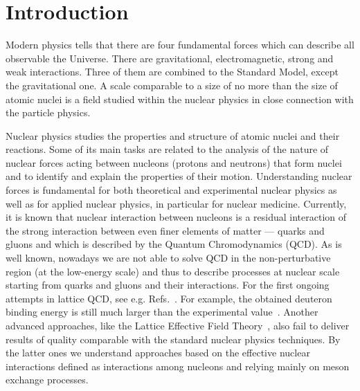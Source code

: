 \chapter{Introduction}
\label{introduction}
Modern physics tells that there are four fundamental forces which can describe all observable the Universe. There are gravitational, electromagnetic, strong and weak interactions. Three of them are combined to the Standard Model, except the gravitational one. A scale comparable to a size of no more than the size of atomic nuclei is a field studied within the nuclear physics in close connection with the particle physics.

Nuclear physics studies the properties and structure of atomic nuclei and their reactions. Some of its main tasks are related to the analysis of the nature of nuclear forces acting between nucleons (protons and neutrons) that form nuclei and to identify and explain the properties of their motion. Understanding nuclear forces is fundamental for both theoretical and experimental nuclear physics as well as for applied nuclear physics, in particular for nuclear medicine. Currently, it is known that nuclear interaction between nucleons is a residual interaction of the strong interaction between even finer elements of matter --- quarks and gluons and which is described by the Quantum Chromodynamics (QCD). As is well known, nowadays we are not able to solve QCD in the non-perturbative region (at the low-energy scale) and thus to describe processes at nuclear scale starting from quarks and gluons and their interactions. For the first ongoing attempts in lattice QCD, see e.g. Refs.~\cite{Beane2011, Aoki2011}. For example, the obtained deuteron binding energy is still much larger than the experimental value~\cite{Beane2013, orginos2015two}. %
Another advanced approaches, like the Lattice Effective Field Theory~\cite{Li2018}, also fail to deliver results of quality comparable with the standard nuclear physics techniques. By the latter ones we understand approaches based on the effective nuclear interactions defined as interactions among nucleons and relying mainly on meson exchange processes. 

